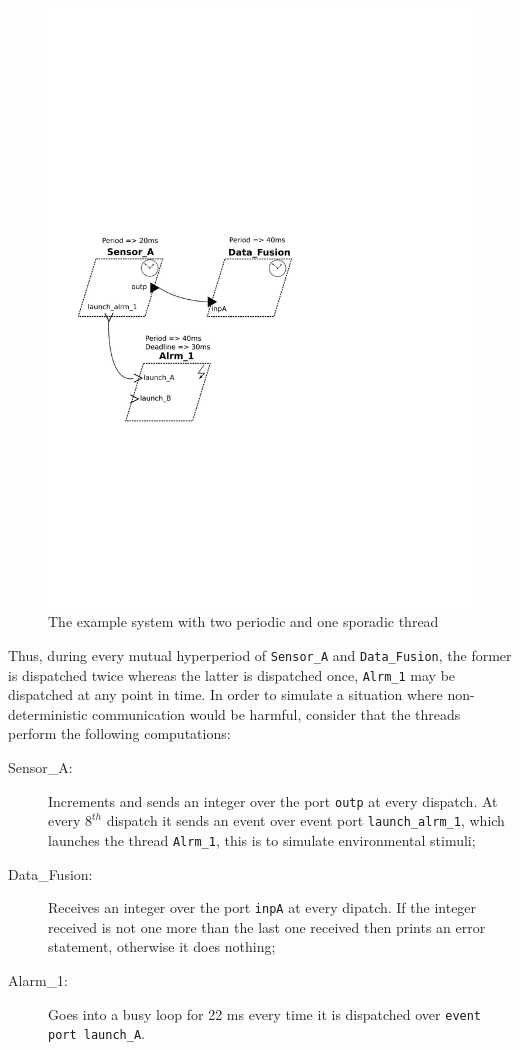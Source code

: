 \begin{figure}
\centering
\includegraphics[scale=0.6]{figs/control}
\caption{The example system with two periodic and one sporadic thread}
\label{fig:control_simple}
\end{figure}

Thus, during every mutual hyperperiod of \texttt{Sensor\_A} and
\texttt{Data\_Fusion}, the former is dispatched twice whereas the
latter is dispatched once, \texttt{Alrm\_1} may be dispatched at any
point in time. In order to simulate a situation where
non-deterministic communication would be harmful, consider that the
threads perform the following computations:

\begin{description}
\item[Sensor\_A:]{Increments and sends an integer over the port
  \texttt{outp} at every dispatch. At every $8^{th}$ dispatch it sends
  an event over event port \texttt{launch\_alrm\_1}, which launches
  the thread \texttt{Alrm\_1}, this is to simulate environmental
  stimuli;}
\item[Data\_Fusion:]{Receives an integer over the port \texttt{inpA}
  at every dipatch. If the integer received is not one more than the
  last one received then prints an error statement, otherwise it does
  nothing;}
\item[Alarm\_1:]{Goes into a busy loop for 22 ms every time it is
  dispatched over \texttt{event port launch\_A}.}
\end{description}

